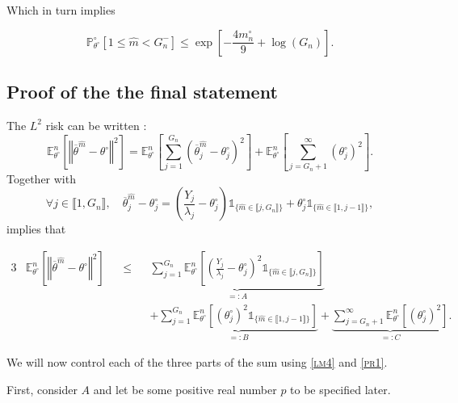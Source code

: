 Which in turn implies

\[\mathds{P}_{\theta^{\circ}}^{\circ} \left[1 \leq \widehat{m} < G_{n}^{-}\right] \leq \exp \left[ - \frac{4 m_{n}^{\circ}}{9} + \log\left(G_{n}\right)\right].\]

\subsection{Proof of the the final statement}

The $L^{2}$ risk can be written :
\[\mathds{E}_{\theta^{\circ}}^{n}\left[\left\Vert \overline{\theta}^{\widehat{m}} - \theta^{\circ} \right\Vert^{2}\right] = \mathds{E}_{\theta^{\circ}}^{n}\left[\sum\limits_{j = 1}^{G_{n}} \left( \overline{\theta}^{\widehat{m}}_{j} - \theta^{\circ}_{j} \right)^{2}\right] + \mathds{E}_{\theta^{\circ}}^{n}\left[\sum\limits_{j = G_{n} + 1}^{\infty} \left(\theta^{\circ}_{j}\right)^{2}\right].\]
Together with
\[\forall j \in \llbracket 1, G_{n} \rrbracket, \quad \overline{\theta}^{\widehat{m}}_{j} - \theta^{\circ}_{j} = \left(\frac{Y_{j}}{\lambda_{j}} - \theta^{\circ}_{j}\right) \mathds{1}_{\{\widehat{m} \in \llbracket j, G_{n} \rrbracket\}} + \theta^{\circ}_{j} \mathds{1}_{\{\widehat{m} \in \llbracket 1, j-1 \rrbracket\}},\]
implies that

\begin{alignat*}{3}
& \mathds{E}_{\theta^{\circ}}^{n}\left[\left\Vert \overline{\theta}^{\widehat{m}} - \theta^{\circ} \right\Vert^{2}\right] &&\leq&& \underbrace{\sum\limits_{j = 1}^{G_{n}}\mathds{E}_{\theta^{\circ}}^{n}\left[\left(\frac{Y_{j}}{\lambda_{j}} - \theta^{\circ}_{j}\right)^{2} \mathds{1}_{\{\widehat{m} \in \llbracket j, G_{n} \rrbracket\}}\right]}_{=: A}\\
& && && + \underbrace{\sum\limits_{j = 1}^{G_{n}}\mathds{E}_{\theta^{\circ}}^{n}\left[\left(\theta^{\circ}_{j}\right)^{2} \mathds{1}_{\{\widehat{m} \in \llbracket 1, j-1 \rrbracket\}}\right]}_{=: B}+ \underbrace{\sum\limits_{j = G_{n} + 1}^{\infty}\mathds{E}_{\theta^{\circ}}^{n}\left[\left( \theta^{\circ}_{j}\right)^{2}\right]}_{=: C}.
\end{alignat*}

\bigskip

We will now control each of the three parts of the sum using \textsc{\cref{lm4}} and \textsc{\cref{pr1}}.

\bigskip

First, consider $A$ and let be some positive real number $p$ to be specified later.

